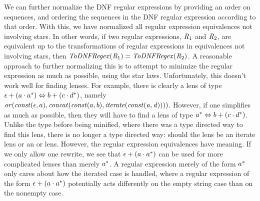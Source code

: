 We can further normalize the DNF regular expressions by providing an order on sequences,
and ordering the sequences in the DNF regular expression according to that order.
With this, we have normalized all regular expression equivalences not involving stars.
In other words, if two regular expressions, $\mathit{R}_1$ and $\mathit{R}_2$,
are equivalent up to the transformations of regular expressions in equivalences
not involving stars,
then $\mathit{ToDNFRegex}(\mathit{R}_1)=\mathit{ToDNFRegex}(\mathit{R}_2)$.
A reasonable approach to further normalizing this is to attempt to minimize the
regular expression as much as possible, using the star laws.
Unfortunately, this doesn't work
well for finding lenses.  For example, there is clearly a lens of type
$\epsilon+(a\cdot a^*) \Leftrightarrow b+(c\cdot d^*)$,
namely $\mathit{or}(\mathit{const}(\epsilon,a),\mathit{concat}(\mathit{const}(a,b),\mathit{iterate(\mathit{const}(a,d))}))$.
However, if one simplifies as much as possible, then they will have to find a lens
of type $a^* \Leftrightarrow b+(c\cdot d^*)$.
Unlike the type before being minified, where there was a type directed way to find
this lens, there is no longer a type directed way: should the lens be an iterate lens
or an or lens.
However, the regular expression equivalences have meaning.
If we only allow one rewrite, we see that
$\epsilon+(a\cdot a^*)$ can be used for more
complicated lenses than merely $a^*$.
A regular expression merely of the form $a^*$ only cares about how the iterated case is handled, where a regular expression of the form
$\epsilon+(a\cdot a^*)$ potentially acts differently on the empty
string case than on the nonempty case.

